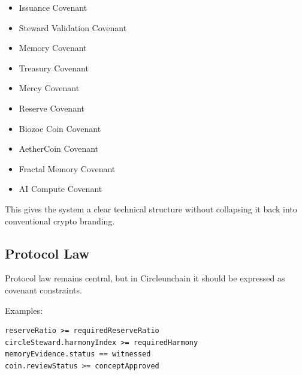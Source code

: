 ﻿\documentclass[12pt]{article}
\begin{document}
\begin{itemize}
  \item Issuance Covenant
\end{itemize}
\begin{itemize}
  \item Steward Validation Covenant
\end{itemize}
\begin{itemize}
  \item Memory Covenant
\end{itemize}
\begin{itemize}
  \item Treasury Covenant
\end{itemize}
\begin{itemize}
  \item Mercy Covenant
\end{itemize}
\begin{itemize}
  \item Reserve Covenant
\end{itemize}
\begin{itemize}
  \item Biozoe Coin Covenant
\end{itemize}
\begin{itemize}
  \item AetherCoin Covenant
\end{itemize}
\begin{itemize}
  \item Fractal Memory Covenant
\end{itemize}
\begin{itemize}
  \item AI Compute Covenant
\end{itemize}

This gives the system a clear technical structure without collapsing it back into conventional crypto branding.

\subsection{Protocol Law}


Protocol law remains central, but in Circleunchain it should be expressed as covenant constraints.

Examples:

\begin{verbatim}
reserveRatio >= requiredReserveRatio
circleSteward.harmonyIndex >= requiredHarmony
memoryEvidence.status == witnessed
coin.reviewStatus >= conceptApproved
\end{verbatim}
\end{document}
